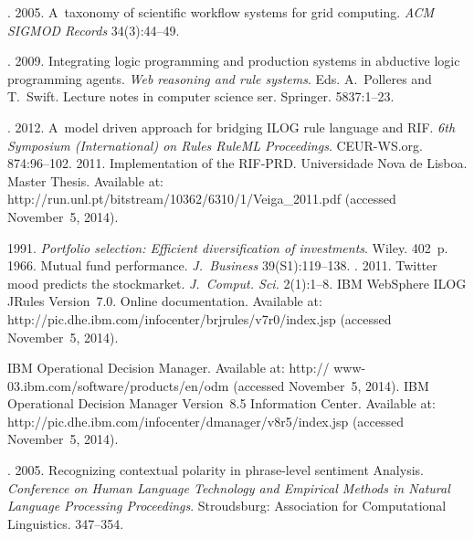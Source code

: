 \begin{multicols}{2}
{{\begin{thebibliography}{99}
. 2005. A~taxonomy of scientific workflow systems for grid
computing. \textit{ACM SIGMOD Records} 34(3):44--49.

. 2009. Integrating logic programming and production
systems in abductive logic programming agents.
\textit{Web reasoning and rule systems}. Eds. A.~Polleres and T.~Swift.
Lecture notes in computer science ser. Springer.
5837:1--23.

. 2012. A~model driven approach
for bridging ILOG rule language and RIF. \textit{6th Symposium (International) on Rules
RuleML Proceedings}. CEUR-WS.org. 874:96--102.
 2011. Implementation of the RIF-PRD.  Universidade
Nova de Lisboa. Master Thesis. Available at: {\sf
http://run.unl.pt/bitstream/10362/6310/1/Veiga\_\linebreak 2011.pdf} (accessed November~5, 2014).

 1991. \textit{Portfolio selection: Efficient diversification of
investments}. Wiley. 402~p.
 1966. Mutual fund performance. \textit{J.~Business}
39(S1):119--138.
. 2011. Twitter mood predicts the stockmarket.
\textit{J.~Comput. Sci.} 2(1):1--8.
IBM WebSphere ILOG JRules Version~7.0. Online documentation. Available at: {\sf
http://pic.dhe.ibm.com/\linebreak infocenter/brjrules/v7r0/index.jsp} (accessed November~5, 2014).

IBM Operational Decision Manager. Available at:
{\sf http:// www-03.ibm.com/software/products/en/odm} (accessed November~5, 2014).
IBM Operational Decision Manager Version~8.5 Information Center. Available at: {\sf
http://pic.dhe.ibm.com/\linebreak infocenter/dmanager/v8r5/index.jsp} (accessed November~5, 2014).


. 2005.
Recognizing contextual polarity in phrase-level sentiment Analysis. \textit{Conference on
Human Language Technology and Empirical Methods in Natural Language Processing
Proceedings}. Stroudsburg: Association for Computational Linguistics. 347--354.




\end{thebibliography} } }

\end{multicols}

